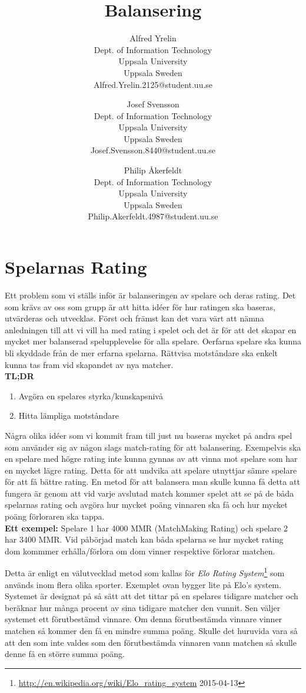 \documentclass[11pt,a4paper]{article}
\author{
Alfred Yrelin \\
\textup{Dept. of Information Technology}\\
\textup{Uppsala University}\\
\textup{Uppsala Sweden}\\
\textup{Alfred.Yrelin.2125@student.uu.se}
\and 
Josef Svensson \\
\textup{Dept. of Information Technology}\\
\textup{Uppsala University}\\
\textup{Uppsala Sweden}\\
\textup{Josef.Svensson.8440@student.uu.se}
\and
Philip Åkerfeldt \\
\textup{Dept. of Information Technology}\\
\textup{Uppsala University}\\
\textup{Uppsala Sweden}\\
\textup{Philip.Akerfeldt.4987@student.uu.se}
}
\title{Balansering}
\begin{document}
\maketitle

\newpage


\section{Spelarnas Rating}
Ett problem som vi ställs inför är balanseringen av spelare och deras rating. Det som krävs av oss som grupp är att hitta idéer för hur ratingen ska baseras, utvärderas och utvecklas. Först och främst kan det vara värt att nämna anledningen till att vi vill ha med rating i spelet och det är för att det skapar en mycket mer balanserad spelupplevelse för alla spelare. Oerfarna spelare ska kunna bli skyddade från de mer erfarna spelarna. Rättvisa motståndare ska enkelt kunna tas fram vid skapandet av nya matcher. \\

\textbf{TL;DR} 
\begin{enumerate}
\item Avgöra en spelares styrka/kunskapsnivå
\item Hitta lämpliga motståndare
\end{enumerate}

Några olika idéer som vi kommit fram till just nu baseras mycket på andra spel som använder sig av någon slags match-rating för att balansering. Exempelvis ska en spelare med högre rating inte kunna gynnas av att vinna mot spelare som har en mycket lägre rating. Detta för att undvika att spelare utnyttjar sämre spelare för att få bättre rating.
En metod för att balansera man skulle kunna få detta att fungera är genom att vid varje avslutad match kommer spelet att se på de båda spelarnas rating och avgöra hur mycket poäng vinnaren ska få och hur mycket poäng förloraren ska tappa.\\ \textbf{Ett exempel:} Spelare 1 har 4000 MMR (MatchMaking Rating) och spelare 2 har 3400 MMR. Vid påbörjad match kan båda spelarna se hur mycket rating dom kommmer erhålla/förlora om dom vinner respektive förlorar matchen. 

Detta är enligt en välutvecklad metod som kallas för \textit{Elo Rating System}\footnote{\url{http://en.wikipedia.org/wiki/Elo_rating_system} 2015-04-13}  som används inom flera olika sporter.
Exemplet ovan bygger lite på Elo's system. Systemet är designat på så sätt att det tittar på en spelares tidigare matcher och beräknar hur många procent av sina tidigare matcher den vunnit. Sen väljer systemet ett förutbestämd vinnare. Om denna förutbestämda vinnare vinner matchen så kommer den få en mindre summa poäng. Skulle det huruvida vara så att den som inte valdes som den förutbestämda vinnaren vann matchen så skulle denne få en större summa poäng.
\end{document}
